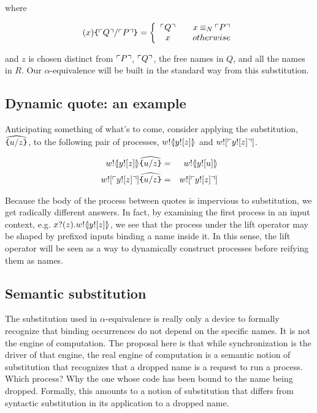 where

\begin{eqnarray}
  (x)\texttt{\{} \ulcorner Q \urcorner / \ulcorner P \urcorner \texttt{\}}            = 
  \left\{ 
    \begin{array}{ccc}
      \ulcorner Q \urcorner & & x \mathbin{\equiv_N} \ulcorner P \urcorner \\
      x & & otherwise \\
    \end{array}
  \right. \nonumber
\end{eqnarray}

and $z$ is chosen distinct from $\ulcorner P \urcorner$, $\ulcorner Q \urcorner$, the free
names in $Q$, and all the names in $R$. Our $\alpha$-equivalence will
be built in the standard way from this substitution.

\subsection{ Dynamic quote: an example }

Anticipating something of what's to come, consider applying the
substitution, $\widehat{\texttt{\{}u / z \texttt{\}}}$, to the following pair
of processes, $w!\langle\!| y![z] |\!\rangle$ and $w![\ulcorner y![z] \urcorner]$.

\begin{eqnarray}
  w!\langle\!| y![z] |\!\rangle\widehat{\texttt{\{}u / z \texttt{\}}}
  & = &
  w!\langle\!| y![u] |\!\rangle \nonumber\\
  w![\ulcorner y![z] \urcorner] \widehat{ \texttt{\{}u / z \texttt{\}} }
  & = &
  w![ \ulcorner y![z] \urcorner] \nonumber
\end{eqnarray}

Because the body of the process between quotes is impervious to
substitution, we get radically different answers. In fact, by
examining the first process in an input context,
e.g. $x?(z).w!\langle\!| y![z] |\!\rangle$, we see that the process under the lift
operator may be shaped by prefixed inputs binding a name inside it. In
this sense, the lift operator will be seen as a way to dynamically
construct processes before reifying them as names.

\subsection{Semantic substitution}

The substitution used in $\alpha$-equivalence is really only a device
to formally recognize that binding occurrences do not depend on the
specific names. It is not the engine of computation. The proposal here
is that while synchronization is the driver of that engine, the real
engine of computation is a semantic notion of substitution that
recognizes that a dropped name is a request to run a process. Which
process? Why the one whose code has been bound to the name being
dropped. Formally, this amounts to a notion of substitution that
differs from syntactic substitution in its application to a dropped
name.

